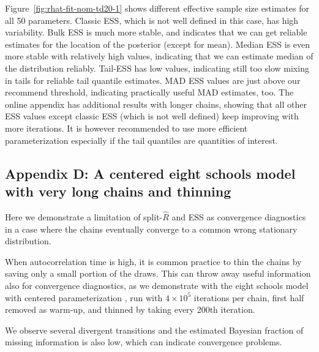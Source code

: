 \documentclass[american,]{article}
\theoremstyle{definition}
\begin{document}
Figure~\ref{fig:rhat-fit-nom-td20-1} shows different effective sample
size estimates for all 50 parameters. Classic ESS, which is not well
defined in this case, has  high variability. Bulk ESS is much more
stable, and indicates that we can get reliable estimates for the
location of the posterior (except for mean). Median ESS is even more
stable with relatively high values, indicating that we can estimate
median of the distribution reliably. Tail-ESS has low values,
indicating still too slow mixing in tails for reliable tail quantile
estimates. MAD ESS values are just above our recommend threshold,
indicating practically useful MAD estimates, too. The online appendix
has additional results with longer chains, showing that all other ESS
values except classic ESS (which is not well defined) keep improving
with more iterations. It is however recommended to use more efficient
parameterization especially if the tail quantiles are quantities of
interest.


\hypertarget{a-centered-eight-schools-model-1}{%
\subsection*{Appendix D: A centered eight schools model with very long chains and
thinning}\label{a-centered-eight-schools-model-1}}


Here we demonstrate a limitation of split-\(\widehat{R}\) and ESS as
convergence diagnostics in a case where the chains eventually converge
to a common wrong stationary distribution.

When autocorrelation time is high, it is common practice to thin the
chains by saving only a small portion of the draws. This can throw
away useful information also for convergence diagnostics, as we demonstrate with the
eight schools model with centered parameterization , run with $4\times 10^5$
iterations per chain, first half removed as warm-up, and thinned by taking every 200th iteration.

We observe several divergent transitions and the estimated Bayesian
fraction of missing information is also low, which can indicate
convergence problems. %
\end{document}
